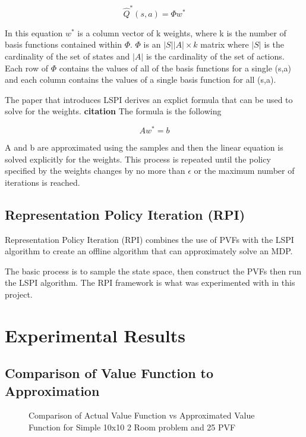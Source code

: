 \documentclass[12pt, letterpaper, final]{report}
\begin{document}
\[
\hat{Q}^*(s,a) = \Phi w^*
\]

In this equation $w^*$ is a column vector of k weights, where k is the
number of basis functions contained within $\Phi$. $\Phi$ is an
$|S||A| \times k$ matrix where $|S|$ is the cardinality of the set of
states and $|A|$ is the cardinality of the set of actions. Each row of
$\Phi$ contains the values of all of the basis functions for a single
(s,a) and each column contains the values of a single basis function
for all (s,a).

The paper that introduces LSPI derives an explict formula that can be
used to solve for the weights. {\bf citation} The formula is the
following

\[ Aw^* = b\]

A and b are approximated using the samples and then the linear
equation is solved explicitly for the weights. This process is
repeated until the policy specified by the weights changes by no more
than $\epsilon$ or the maximum number of iterations is reached.

\subsection*{Representation Policy Iteration (RPI)}

Representation Policy Iteration (RPI) combines the use of PVFs with
the LSPI algorithm to create an offline algorithm that can
approximately solve an MDP.

The basic process is to sample the state space, then construct the
PVFs then run the LSPI algorithm. The RPI framework is what was
experimented with in this project.

\section{Experimental Results}

\subsection*{Comparison of Value Function to Approximation}

\FloatBarrier
\begin{figure}[h!]
\centering

\caption{Comparison of Actual Value Function vs Approximated Value
  Function for Simple 10x10 2 Room problem and 25 PVF}
\label{valueVsQ1}
\end{figure}
\FloatBarrier
\end{document}
